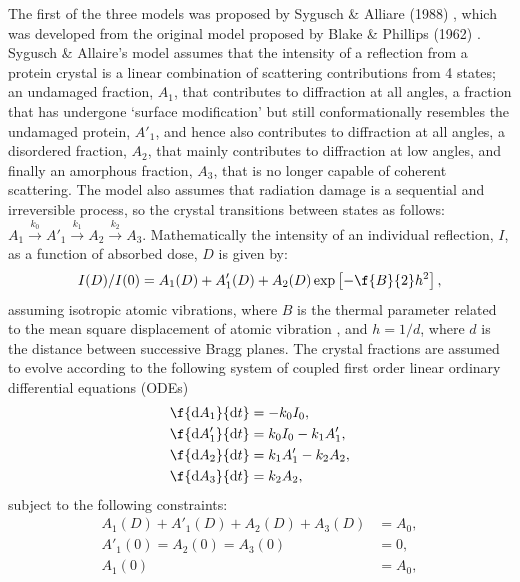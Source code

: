 The first of the three models was proposed by Sygusch \& Alliare (1988) \cite{sygusch1988}, which was developed from the original model proposed by Blake \& Phillips (1962) \cite{blake1962}.
Sygusch \& Allaire's model assumes that the intensity of a reflection from a protein crystal is a linear combination of scattering contributions from 4 states; an undamaged fraction, $A_1$, that contributes to diffraction at all angles, a fraction that has undergone `surface modification' but still conformationally resembles the undamaged protein, $A'_1$, and hence also contributes to diffraction at all angles, a disordered fraction, $A_2$, that mainly contributes to diffraction at low angles, and finally an amorphous fraction, $A_3$, that is no longer capable of coherent scattering.
The model also assumes that radiation damage is a sequential and irreversible process, so the crystal transitions between states as follows: $A_1 \xrightarrow{k_0} A'_1 \xrightarrow{k_1} A_2 \xrightarrow{k_2} A_3$.
Mathematically the intensity of an individual reflection, $I$, as a function of absorbed dose, $D$ is given by:
\begin{equation}
I(D)/I(0) = A_1(D) + A'_1(D) + A_2(D) \exp \left[ -\f{B}{2}h^2\right],
\label{eq: Sygusch and Allaire DDM}
\end{equation}
assuming isotropic atomic vibrations, where $B$ is the thermal parameter related to the mean square displacement of atomic vibration \cite{drenth1999}, and $h = 1/d$, where $d$ is the distance between successive Bragg planes.
\newline
The crystal fractions are assumed to evolve according to the following system of coupled first order linear ordinary differential equations (ODEs)
\begin{subequations}
	\begin{align}
		\f{\mathrm{d}A_1}{\mathrm{d}t}  &= - k_0 I_0,                        \\
		\f{\mathrm{d}A'_1}{\mathrm{d}t} &=   k_0 I_0  - k_1 A'_1,            \\
		\f{\mathrm{d}A_2}{\mathrm{d}t}  &=              k_1 A'_1  - k_2 A_2, \\
		\f{\mathrm{d}A_3}{\mathrm{d}t}  &=                          k_2 A_2,
	\end{align}
\label{eq:ODE system Syg and All}
\end{subequations}
subject to the following constraints:
\begin{subequations}
\begin{align}
A_1(D) + A'_1(D) + A_2(D) + A_3(D) &= A_0, \\
A'_1(0) = A_2(0) = A_3(0)          &= 0,   \\
A_1(0)                             &= A_0,
\end{align}
\label{eq: ODE constraints Syg and All}
\end{subequations}
